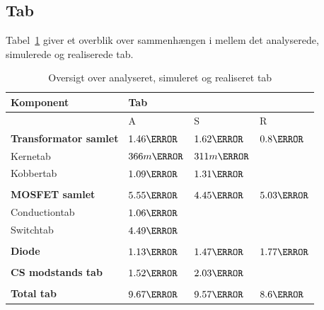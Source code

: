 \subsection{Tab}
Tabel~\ref{tab:realisering_tab} giver et overblik over sammenhængen i mellem det analyserede, simulerede og realiserede tab.
\begin{table}[H] 			
	\centering
	\begin{tabularx}{\textwidth}{|X|l|l|l|}
		\hline
		\textbf{\large Komponent} & \multicolumn{3}{|l|}{\textbf{\large Tab}} \\ \hline
		& A & S	& R\\ \hline
		\textbf{Transformator samlet} & $1.46\watt$ & $1.62\watt$ & $0.8\watt$\\ \hline 
		Kernetab & $366m\watt$ & $311m\watt$ &  \\ \hline
		Kobbertab & $1.09\watt$ & $1.31\watt$ & \\ \hline
		& &	& \\ \hline
		\textbf{MOSFET samlet} & $5.55\watt$ & $4.45\watt$ & $5.03\watt$\\ \hline
		Conductiontab & $1.06\watt$ & & \\ \hline
		Switchtab & $4.49\watt$ &  &    \\ \hline
		& &	& \\ \hline
		\textbf{Diode} & $1.13\watt$ & $1.47\watt$ & $1.77\watt$\\ \hline
		& &	& \\ \hline
		\textbf{CS modstands tab} & $1.52\watt$ & $2.03\watt$ & \\ \hline
		& &	& \\ \hline
		\textbf{Total tab} & $9.67\watt$ & $9.57\watt$ & $8.6\watt$\\ \hline
	\end{tabularx}
	\caption{Oversigt over analyseret, simuleret og realiseret tab}
	\label{tab:realisering_tab}
\end{table}

